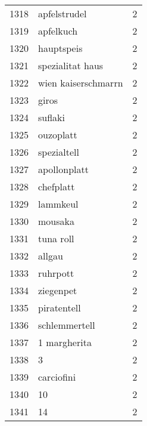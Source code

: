 \begin{tabular}{llr}
1318 &                                       apfelstrudel &      2 \\
1319 &                                          apfelkuch &      2 \\
1320 &                                         hauptspeis &      2 \\
1321 &                                   spezialitat haus &      2 \\
1322 &                                wien kaiserschmarrn &      2 \\
1323 &                                              giros &      2 \\
1324 &                                            suflaki &      2 \\
1325 &                                          ouzoplatt &      2 \\
1326 &                                        spezialtell &      2 \\
1327 &                                       apollonplatt &      2 \\
1328 &                                          chefplatt &      2 \\
1329 &                                           lammkeul &      2 \\
1330 &                                            mousaka &      2 \\
1331 &                                          tuna roll &      2 \\
1332 &                                             allgau &      2 \\
1333 &                                           ruhrpott &      2 \\
1334 &                                          ziegenpet &      2 \\
1335 &                                        piratentell &      2 \\
1336 &                                      schlemmertell &      2 \\
1337 &                                       1 margherita &      2 \\
1338 &                                                  3 &      2 \\
1339 &                                         carciofini &      2 \\
1340 &                                                 10 &      2 \\
1341 &                                                 14 &      2 \\

\end{tabular}

